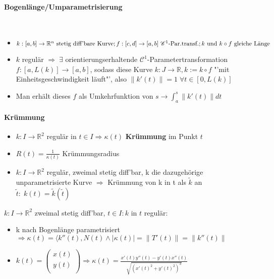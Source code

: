 \documentclass[paper=a3,paper=landscape, fontsize=9pt, DIV=30]{scrartcl}
\newcommand{\real}{{\mathbb{R}}}
\begin{document}
\begin{multicols*}{4}
  \paragraph{Bogenlänge/Umparametrisierung}\hspace{0pt} \\
\begin{itemize}
	\item   $k: [a,b] \rightarrow \real^n \ \text{stetig diff'bare Kurve};\\ f:[c,d] \rightarrow [a,b] \ \mathscr{C}^1\text{-Par.transf.}; k \ \text{und}\ k \circ f \ \text{gleiche Länge} $
	\item $k$ regulär $\Rightarrow\;\exists$ orientierungserhaltende $\mathscr{C}^1$-Parametertransformation $f : [a,L(k)] \rightarrow [a,b]$, sodass diese Kurve $k: J \rightarrow \real, k := k \circ f$ "'mit Einheitsgeschwindigkeit läuft"', also $\lVert k'(t) \rVert = 1 \; \forall t \in [0,L(k)]$
	\item Man erhält dieses $f$ als Umkehrfunktion von $s \rightarrow \int_{a}^{s} \lVert k'(t)\rVert dt$
\end{itemize}

  \paragraph{Krümmung}
  \begin{itemize}
  	\item $k: I \rightarrow \real^2$ regulär in $t \in I \Rightarrow \kappa(t)$ \textbf{Krümmung} im Punkt $t$
  	\item $R(t) = \frac{1}{\kappa(t)}$ Krümmungsradius
  	\item $k: I \rightarrow \real^2$ regulär, zweimal stetig diff'bar, k die dazugehörige unparametrisierte Kurve $\Rightarrow$ Krümmung von k in t als $\tilde{k}$ an $\tilde{t}:\;k(t)=\tilde{k}(\tilde{t})$
  \end{itemize}
	$k: I \rightarrow \real^2$ zweimal stetig diff'bar, $t \in I: k$ in $t$ regulär:
	\begin{itemize}
		\item k nach Bogenlänge parametrisiert $\Rightarrow \kappa(t)=\langle k''(t), N(t) \wedge \lvert \kappa(t)\rvert = \lVert T'(t) \rVert = \lVert k''(t) \rVert$
		\item $k(t) =
		\begin{pmatrix}
			x(t)\\y(t)\\
		\end{pmatrix}
		\Rightarrow \kappa(t)=\frac{x'(t)y''(t)-y'(t)x''(t)}{\sqrt{(x'(t)^2+y'(t)^2)^3}}$
	\end{itemize}

\end{multicols*}
\end{document}
